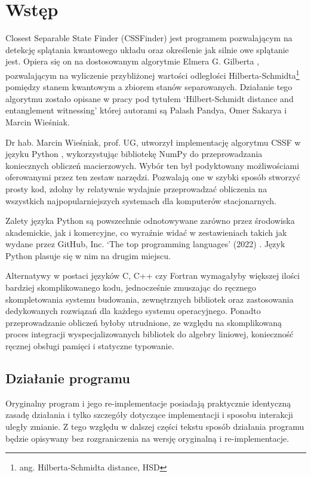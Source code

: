 \documentclass[11pt, a4paper]{article}
\begin{document}
  \begin{sloppypar}
    \section{Wstęp}
    Closest Separable State Finder (CSSFinder) jest programem pozwalającym na detekcję splątania
    kwantowego układu oraz określenie jak silnie owe splątanie jest. Opiera się on na
    dostosowanym algorytmie Elmera G. Gilberta \cite{Lindemann_Gilbert}, pozwalającym na
    wyliczenie przybliżonej wartości odległości Hilberta-Schmidta\footnote{ang. Hilberta-Schmidta
    distance, HSD} pomiędzy stanem kwantowym a zbiorem stanów separowanych. Działanie tego
    algorytmu zostało opisane w pracy pod tytułem `Hilbert-Schmidt distance and
    entanglement witnessing' \cite{MW_Hilbert_Schmidt_distance} której autorami są Palash
    Pandya, Omer Sakarya i Marcin Wieśniak.

    Dr hab. Marcin Wieśniak, prof. UG, utworzył implementację algorytmu CSSF w języku
    Python \cite{Python_Language}, wykorzystując bibliotekę NumPy \cite{NumPy_Article} do
    przeprowadzania koniecznych obliczeń macierzowych. Wybór ten był podyktowany
    możliwościami oferowanymi przez ten zestaw narzędzi. Pozwalają one w szybki sposób stworzyć
    prosty kod, zdolny by relatywnie wydajnie przeprowadzać obliczenia na wszystkich
    najpopularniejszych systemach dla komputerów stacjonarnych.

    Zalety języka Python są powszechnie odnotowywane zarówno przez środowiska
    akademickie, jak i komercyjne, co wyraźnie widać w zestawieniach takich jak wydane
    przez GitHub, Inc. `The top programming languages' (2022)
    \cite{GitHub_Top_languages}. Język Python plasuje się w nim na drugim miejscu.

    Alternatywy w postaci języków C, C++ czy Fortran wymagałyby większej ilości bardziej
    skomplikowanego kodu, jednocześnie zmuszając do ręcznego skompletowania systemu budowania,
    zewnętrznych bibliotek oraz zastosowania dedykowanych rozwiązań dla każdego systemu
    operacyjnego. Ponadto przeprowadzanie obliczeń byłoby utrudnione, ze względu na
    skomplikowaną proces integracji wyspecjalizowanych bibliotek do algebry liniowej, konieczność
    ręcznej obsługi pamięci i statyczne typowanie.

    \subsection{Działanie programu}
    Oryginalny program i jego re-implementacje posiadają praktycznie identyczną zasadę działania
    i tylko szczegóły dotyczące implementacji i sposobu interakcji uległy zmianie. Z
    tego względu w dalszej części tekstu sposób działania programu będzie opisywany bez
    rozgraniczenia na wersję oryginalną i re-implementacje.


\end{sloppypar}
\end{document}
